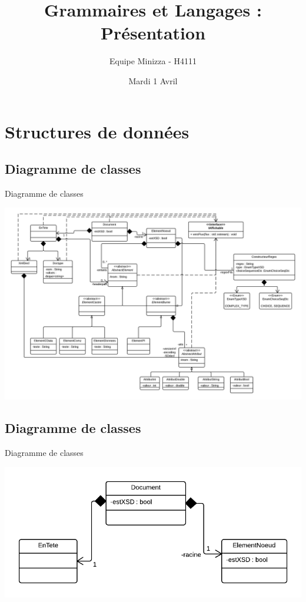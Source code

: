 \documentclass[aspectratio=169]{beamer}
\title[GetL_Presentation]{Grammaires et Langages : Présentation}
\author{Equipe Minizza - H4111}
\institute{INSA de Lyon}
\date{Mardi 1 Avril}
\begin{document}
\begin{frame}
\titlepage
\end{frame}

%


\section{Structures de données}
\subsection{Diagramme de classes}
\begin{frame}{Diagramme de classes}
\begin{center}
 \includegraphics[scale=0.17]{diagdcla}
\end{center}
\end{frame}

\subsection{Diagramme de classes}
\begin{frame}{Diagramme de classes}
\begin{center}
  \includegraphics[scale=0.3]{ddc_doc}
\end{center}
\end{frame}
\end{document}
